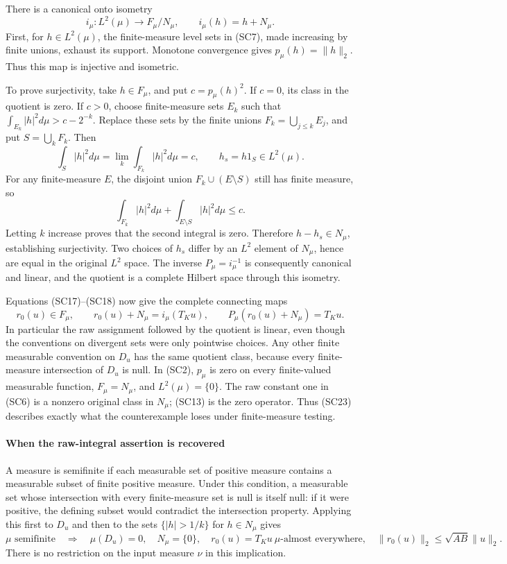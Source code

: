 \documentclass[
  11pt,
]{article}
\begin{document}
There is a canonical onto isometry \[
 i_\mu:L^2(\mu)\longrightarrow F_\mu/N_\mu,\qquad
 i_\mu(h)=h+N_\mu .
 \tag{SC20}
\] First, for \(h\in L^2(\mu)\), the finite-measure level sets in (SC7),
made increasing by finite unions, exhaust its support. Monotone
convergence gives \(p_\mu(h)=\|h\|_2\). Thus this map is injective and
isometric.

To prove surjectivity, take \(h\in F_\mu\), and put \(c=p_\mu(h)^2\). If
\(c=0\), its class in the quotient is zero. If \(c>0\), choose
finite-measure sets \(E_k\) such that \(\int_{E_k}|h|^2d\mu>c-2^{-k}\).
Replace these sets by the finite unions \(F_k=\bigcup_{j\leq k}E_j\),
and put \(S=\bigcup_kF_k\). Then \[
 \int_S|h|^2d\mu=\lim_k\int_{F_k}|h|^2d\mu=c,\qquad
 h_s=h1_S\in L^2(\mu).
 \tag{SC21}
\] For any finite-measure \(E\), the disjoint union
\(F_k\cup(E\setminus S)\) still has finite measure, so \[
 \int_{F_k}|h|^2d\mu+\int_{E\setminus S}|h|^2d\mu\leq c .
 \tag{SC22}
\] Letting \(k\) increase proves that the second integral is zero.
Therefore \(h-h_s\in N_\mu\), establishing surjectivity. Two choices of
\(h_s\) differ by an \(L^2\) element of \(N_\mu\), hence are equal in
the original \(L^2\) space. The inverse \(P_\mu=i_\mu^{-1}\) is
consequently canonical and linear, and the quotient is a complete
Hilbert space through this isometry.

Equations (SC17)--(SC18) now give the complete connecting maps \[
 r_0(u)\in F_\mu,\qquad
 r_0(u)+N_\mu=i_\mu(T_Ku),\qquad
 P_\mu(r_0(u)+N_\mu)=T_Ku .
 \tag{SC23}
\] In particular the raw assignment followed by the quotient is linear,
even though the conventions on divergent sets were only pointwise
choices. Any other finite measurable convention on \(D_u\) has the same
quotient class, because every finite-measure intersection of \(D_u\) is
null. In (SC2), \(p_\mu\) is zero on every finite-valued measurable
function, \(F_\mu=N_\mu\), and \(L^2(\mu)=\{0\}\). The raw constant one
in (SC6) is a nonzero original class in \(N_\mu\); (SC13) is the zero
operator. Thus (SC23) describes exactly what the counterexample loses
under finite-measure testing.

\paragraph{When the raw-integral assertion is
recovered}\label{when-the-raw-integral-assertion-is-recovered}

A measure is semifinite if each measurable set of positive measure
contains a measurable subset of finite positive measure. Under this
condition, a measurable set whose intersection with every finite-measure
set is null is itself null: if it were positive, the defining subset
would contradict the intersection property. Applying this first to
\(D_u\) and then to the sets \(\{|h|>1/k\}\) for \(h\in N_\mu\) gives {\footnotesize
\[
 \mu\text{ semifinite}\quad\Longrightarrow\quad
 \mu(D_u)=0,\quad N_\mu=\{0\},\quad
 r_0(u)=T_Ku\ \mu\text{-almost everywhere},\quad
 \|r_0(u)\|_2\leq\sqrt{AB}\|u\|_2 .
 \tag{SC24}
\]
} There is no restriction on the input measure \(\nu\) in this
implication.
\end{document}
